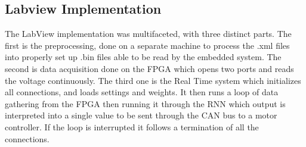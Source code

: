 \subsection{Labview Implementation}
The LabView implementation was multifaceted, with three distinct parts. The first is the preprocessing, done on a separate machine to process the .xml files into properly set up .bin files able
to be read by the embedded system. The second is data acquisition done on the \acrfull{FPGA} which opens two ports and reads the voltage continuously. The third one is the Real Time system which
initializes all connections, and loads settings and weights. It then runs a loop of data gathering from the \acrshort{FPGA} then running it through the RNN which output is interpreted into a single 
value to be sent through the CAN bus to a motor controller. If the loop is interrupted it follows a termination of all the connections.